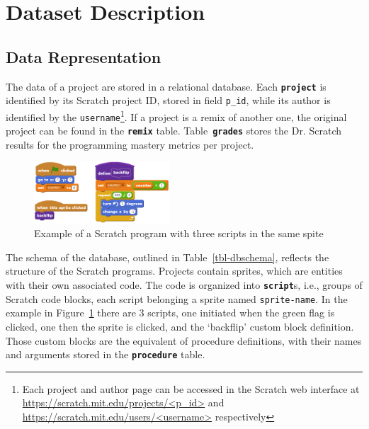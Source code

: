 \documentclass[10pt, conference]{IEEEtran}
\begin{document}
\section{Dataset Description}

\subsection{Data Representation}

The data of a project are stored in a relational database. Each \textbf{\texttt{project}} is identified by its Scratch project ID, stored in field \texttt{p\_id}, while its author is identified by the \texttt{username}\footnote{\label{fn-authorpage}Each project and author page can be accessed in the Scratch web interface at \url{https://scratch.mit.edu/projects/<p_id>} and \url{https://scratch.mit.edu/users/<username>} respectively}.
If a project is a remix of another one, the original project can be found in the \textbf{\texttt{remix}} table.
Table~\textbf{\texttt{grades}} stores the Dr. Scratch results for the programming mastery metrics per project.
 
 \begin{figure}
 	\centering
 	\includegraphics[width=0.45\textwidth]{scratchExample}
 	\caption{Example of a Scratch program with three scripts in the same spite}
 	\label{fig-scratchExample}
 \end{figure}

The schema of the database, outlined in Table~\ref{tbl-dbschema}, reflects the structure of the Scratch programs.
Projects contain sprites, which are entities with their own associated code.
The code is organized into \textbf{\texttt{script}}s, i.e., groups of Scratch code blocks, each script belonging a sprite named \texttt{sprite-name}.
In the example in Figure~\ref{fig-scratchExample} there are 3 scripts, one initiated when the green flag is clicked, one then the sprite is clicked, and the `backflip' custom block definition.
Those custom blocks are the equivalent of procedure definitions, with their names and arguments stored in the \textbf{\texttt{procedure}} table.
\end{document}
